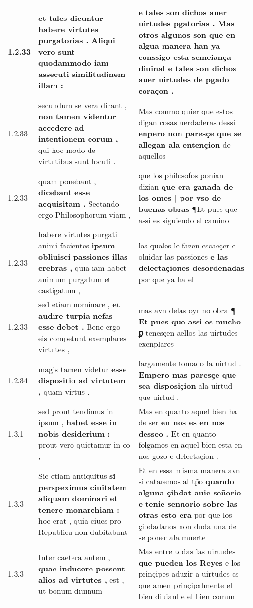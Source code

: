 \begin{tabular}{|p{1cm}|p{6.5cm}|p{6.5cm}|}
1.2.33 & et tales dicuntur \textbf{ habere virtutes purgatorias . Aliqui vero sunt } quodammodo iam assecuti similitudinem illam : & e tales son dichos auer uirtudes pgatorias . \textbf{ Mas otros algunos son que en algua manera han ya conssigo esta semeiança diuinal } e tales son dichos auer uirtudes de pgado coraçon . \\\hline
1.2.33 & secundum se vera dicant , \textbf{ non tamen videntur accedere ad intentionem eorum , } qui hoc modo de virtutibus sunt locuti . & Mas commo quier que estos digan cosas uerdaderas dessi \textbf{ enpero non paresçe que se allegan ala entençion } de aquellos \\\hline
1.2.33 & quam ponebant , \textbf{ dicebant esse acquisitam . } Sectando ergo Philosophorum viam , & que los philosofos ponian dizian \textbf{ que era ganada de los omes | por vso de buenas obras } ¶Et pues que assi es siguiendo el camino \\\hline
1.2.33 & habere virtutes purgati animi facientes \textbf{ ipsum obliuisci passiones illas crebras , } quia iam habet animum purgatum et castigatum , & las quales le fazen escaeçer e oluidar las passiones \textbf{ e las delectaçiones desordenadas } por que ya ha el \\\hline
1.2.33 & sed etiam nominare , \textbf{ et audire turpia nefas esse debet . } Bene ergo eis competunt exemplares virtutes , & mas avn delas oyr no obra ¶ \textbf{ Et pues que assi es mucho ꝑ } tenesçen aellos las uirtudes exenplares \\\hline
1.2.34 & magis tamen videtur \textbf{ esse dispositio ad virtutem , } quam virtus . & largamente tomado la uirtud . \textbf{ Empero mas paresçe que sea disposiçion } ala uirtud que uirtud . \\\hline
1.3.1 & sed prout tendimus in ipsum , \textbf{ habet esse in nobis desiderium : } prout vero quietamur in eo , & Mas en quanto aquel bien ha de ser \textbf{ en nos es en nos desseo . } Et en quanto folgamos en aquel bien esta en nos gozo e delectaçion . \\\hline
1.3.3 & Sic etiam antiquitus \textbf{ si perspeximus ciuitatem aliquam dominari et tenere monarchiam : } hoc erat , quia ciues pro Republica non dubitabant & Et en essa misma manera avn si cataremos al tp̃o \textbf{ quando alguna çibdat auie señorio e tenie sennorio sobre las otras esto era } por que los çibdadanos non duda una de se poner ala muerte \\\hline
1.3.3 & Inter caetera autem , \textbf{ quae inducere possent alios ad virtutes , } est , ut bonum diuinum & Mas entre todas las uirtudes \textbf{ que pueden los Reyes } e los prinçipes aduzir a uirtudes es que amen prinçipalmente el bien diuianl e el bien comun \\\hline

\end{tabular}
